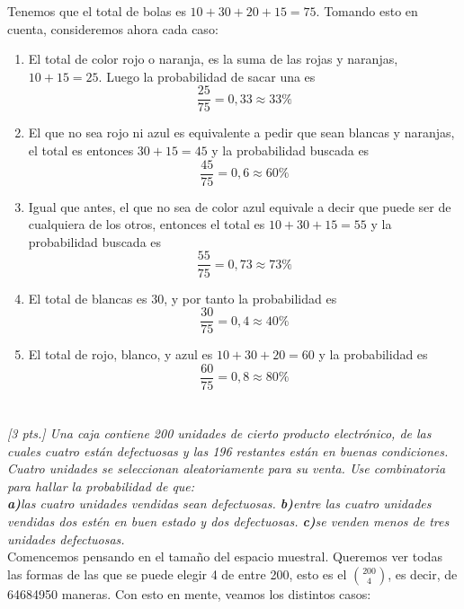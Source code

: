 \documentclass[11pt]{article}
\renewcommand{\(}{\left(}
\renewcommand{\)}{\right)}
\begin{document}
Tenemos que el total de bolas es $10+30+20+15=75$. Tomando esto en cuenta, consideremos ahora cada caso:
\begin{enumerate}
	\item El total de color rojo o naranja, es la suma de las rojas y naranjas, $10+15=25$. Luego la probabilidad de sacar una es $$\dfrac{25}{75} = 0,33 \approx 33\%$$
	\item El que no sea rojo ni azul es equivalente a pedir que sean blancas y naranjas, el total es entonces $30+15=45$ y la probabilidad buscada es $$ \dfrac{45}{75} = 0,6 \approx 60\% $$
	\item Igual que antes, el que no sea de color azul equivale a decir que puede ser de cualquiera de los otros, entonces el total es $10+30+15=55$ y la probabilidad buscada es $$ \dfrac{55}{75} = 0,73 \approx 73\% $$
	\item El total de blancas es $30$, y por tanto la probabilidad es $$ \dfrac{30}{75} = 0,4 \approx 40\% $$
	\item El total de rojo, blanco, y azul es $10+30+20=60$ y la probabilidad es $$\frac{60}{75} = 0,8 \approx 80\%$$
\end{enumerate}

\section{}

\textit{[3 pts.] Una caja contiene 200 unidades de cierto producto electrónico, de las cuales cuatro están defectuosas y las 196 restantes están en buenas condiciones. Cuatro unidades se seleccionan aleatoriamente para su venta. Use combinatoria para hallar la probabilidad de que: \\ \textbf{a)}las cuatro unidades vendidas sean defectuosas. \textbf{b)}entre las cuatro unidades vendidas dos estén en buen estado y dos defectuosas. \textbf{c)}se venden menos de tres unidades defectuosas.} \\

Comencemos pensando en el tamaño del espacio muestral. Queremos ver todas las formas de las que se puede elegir 4 de entre 200, esto es el $\binom{200}{4}$, es decir, de 64684950 maneras. Con esto en mente, veamos los distintos casos:
\end{document}
